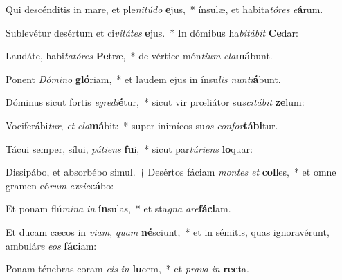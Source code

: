 \item Qui descénditis in mare, et ple\textit{ni}\textit{tú}\textit{do} \textbf{e}jus,~* ínsulæ, et habita\textit{tó}\textit{res} \textit{e}\textbf{á}rum.
\item Sublevétur desértum et ci\textit{vi}\textit{tá}\textit{tes} \textbf{e}jus.~* In dómibus ha\textit{bi}\textit{tá}\textit{bit} \textbf{Ce}dar:
\item Laudáte, habi\textit{ta}\textit{tó}\textit{res} \textbf{Pe}træ,~* de vértice món\textit{ti}\textit{um} \textit{cla}\textbf{má}bunt.
\item Ponent \textit{Dó}\textit{mi}\textit{no} \textbf{gló}riam,~* et laudem ejus in ínsu\textit{lis} \textit{nun}\textit{ti}\textbf{á}bunt.
\item Dóminus sicut fortis \textit{e}\textit{gre}\textit{di}\textbf{é}tur,~* sicut vir prœliátor su\textit{sci}\textit{tá}\textit{bit} \textbf{ze}lum:
\item Vociferábi\textit{tur}, \textit{et} \textit{cla}\textbf{má}bit:~* super inimícos su\textit{os} \textit{con}\textit{for}\textbf{tá}\textbf{bi}tur.
\item Tácui semper, sílui, \textit{pá}\textit{ti}\textit{ens} \textbf{fu}i,~* sicut par\textit{tú}\textit{ri}\textit{ens} \textbf{lo}quar:
\item Dissipábo, et absorbébo simul.~† Desértos fáciam \textit{mon}\textit{tes} \textit{et} \textbf{col}les,~* et omne gramen eó\textit{rum} \textit{ex}\textit{sic}\textbf{cá}bo:
\item Et ponam flú\textit{mi}\textit{na} \textit{in} \textbf{ín}sulas,~* et sta\textit{gna} \textit{a}\textit{re}\textbf{fá}\textbf{ci}am.
\item Et ducam cæcos in \textit{vi}\textit{am}, \textit{quam} \textbf{né}sciunt,~* et in sémitis, quas ignoravérunt, ambulá\textit{re} \textit{e}\textit{os} \textbf{fá}\textbf{ci}am:
\item Ponam ténebras coram \textit{e}\textit{is} \textit{in} \textbf{lu}cem,~* et \textit{pra}\textit{va} \textit{in} \textbf{rec}ta.
